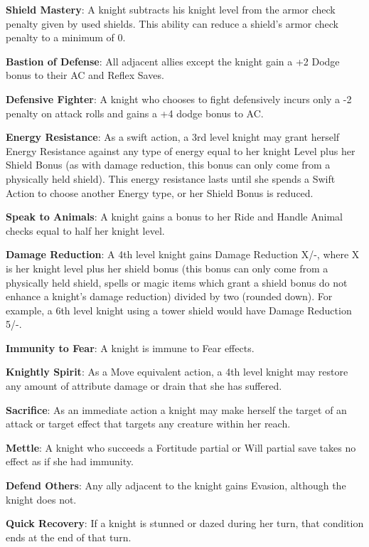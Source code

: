 \textbf{Shield Mastery}: A knight subtracts his knight level from the armor check penalty given by used shields. This ability can reduce a shield's armor check penalty to a minimum of 0.

\textbf{Bastion of Defense}: All adjacent allies except the knight gain a +2 Dodge bonus to their AC and Reflex Saves.

\textbf{Defensive Fighter}: A knight who chooses to fight defensively incurs only a -2 penalty on attack rolls and gains a +4 dodge bonus to AC.

\textbf{Energy Resistance}: As a swift action, a 3rd level knight may grant herself Energy Resistance against any type of energy equal to her knight Level plus her Shield Bonus (as with damage reduction, this bonus can only come from a physically held shield). This energy resistance lasts until she spends a Swift Action to choose another Energy type, or her Shield Bonus is reduced.

\textbf{Speak to Animals}: A knight gains a bonus to her Ride and Handle Animal checks equal to half her knight level.

\textbf{Damage Reduction}: A 4th level knight gains Damage Reduction X/-, where X is her knight level plus her shield bonus (this bonus can only come from a physically held shield, spells or magic items which grant a shield bonus do not enhance a knight's damage reduction) divided by two (rounded down). For example, a 6th level knight using a tower shield would have Damage Reduction 5/-.

\textbf{Immunity to Fear}: A knight is immune to Fear effects.

\textbf{Knightly Spirit}: As a Move equivalent action, a 4th level knight may restore any amount of attribute damage or drain that she has suffered.

\textbf{Sacrifice}: As an immediate action a knight may make herself the target of an attack or target effect that targets any creature within her reach.

\textbf{Mettle}: A knight who succeeds a Fortitude partial or Will partial save takes no effect as if she had immunity.

\textbf{Defend Others}: Any ally adjacent to the knight gains Evasion, although the knight does not.

\textbf{Quick Recovery}: If a knight is stunned or dazed during her turn, that condition ends at the end of that turn.